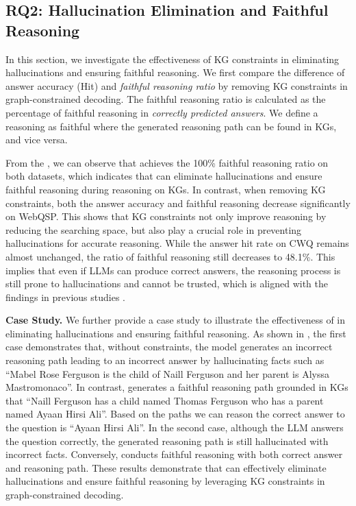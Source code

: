 
\subsection{RQ2: Hallucination Elimination and Faithful Reasoning}

In this section, we investigate the effectiveness of KG constraints in eliminating hallucinations and ensuring faithful reasoning. We first compare the difference of answer accuracy (Hit) and \emph{faithful reasoning ratio} by removing KG constraints in graph-constrained decoding. The faithful reasoning ratio is calculated as the percentage of faithful reasoning in \emph{correctly predicted answers}. We define a reasoning as faithful where the generated reasoning path can be found in KGs, and vice versa. 

From the , we can observe that \ourmethod achieves the 100\% faithful reasoning ratio on both datasets, which indicates that \ourmethod can eliminate hallucinations and ensure faithful reasoning during reasoning on KGs. In contrast, when removing KG constraints, both the answer accuracy and faithful reasoning decrease significantly on WebQSP. This shows that KG constraints not only improve reasoning by reducing the searching space, but also play a crucial role in preventing hallucinations for accurate reasoning. While the answer hit rate on CWQ remains almost unchanged, the ratio of faithful reasoning still decreases to 48.1\%. This implies that even if LLMs can produce correct answers, the reasoning process is still prone to hallucinations and cannot be trusted, which is aligned with the findings in previous studies \citep{nguyen-etal-2024-direct}.



\noindent\textbf{Case Study.} We further provide a case study to illustrate the effectiveness of \ourmethod in eliminating hallucinations and ensuring faithful reasoning. As shown in , the first case demonstrates that, without constraints, the model generates an incorrect reasoning path leading to an incorrect answer by hallucinating facts such as ``Mabel Rose Ferguson is the child of Naill Ferguson and her parent is Alyssa Mastromonaco''. In contrast, \ourmethod generates a faithful reasoning path grounded in KGs that ``Naill Ferguson has a child named Thomas Ferguson who has a parent named Ayaan Hirsi Ali''. Based on the paths we can reason the correct answer to the question is ``Ayaan Hirsi Ali''. In the second case, although the LLM answers the question correctly, the generated reasoning path is still hallucinated with incorrect facts. Conversely, \ourmethod conducts faithful reasoning with both correct answer and reasoning path. These results demonstrate that \ourmethod can effectively eliminate hallucinations and ensure faithful reasoning by leveraging KG constraints in graph-constrained decoding.

